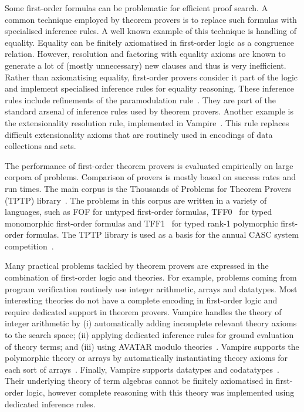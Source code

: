 Some first-order formulas can be problematic for efficient proof search. A common technique employed by theorem provers is to replace such formulas with specialised inference rules. A well known example of this technique is handling of equality. Equality can be finitely axiomatised in first-order logic as a congruence relation. However, resolution and factoring with equality axioms are known to generate a lot of (mostly unnecessary) new clauses and thus is very inefficient. Rather than axiomatising equality, first-order provers consider it part of the logic and implement specialised inference rules for equality reasoning. These inference rules include refinements of the paramodulation rule~\cite{WRCS67,Robinson1969}. They are part of the standard arsenal of inference rules used by theorem provers. Another example is the extensionality resolution rule, implemented in Vampire~\cite{ATVA14}. This rule replaces difficult extensionality axioms that are routinely used in encodings of data collections and sets.

The performance of first-order theorem provers is evaluated empirically on large corpora of problems. Comparison of provers is mostly based on success rates and run times. The main corpus is the Thousands of Problems for Theorem Provers (TPTP) library~\cite{TPTP}. The problems in this corpus are written in a variety of languages, such as FOF for untyped first-order formulas, TFF0~\cite{tff0} for typed monomorphic first-order formulas and TFF1~\cite{tff1} for typed rank-1 polymorphic first-order formulas. The TPTP library is used as a basis for the annual CASC system competition~\cite{CASC}.

Many practical problems tackled by theorem provers are expressed in the combination of first-order logic and theories. For example, problems coming from program verification routinely use integer arithmetic, arrays and datatypes. Most interesting theories do not have a complete encoding in first-order logic and require dedicated support in theorem provers. Vampire handles the theory of integer arithmetic by (i) automatically adding incomplete relevant theory axioms to the search space; (ii) applying dedicated inference rules for ground evaluation of theory terms; and (iii) using AVATAR modulo theories~\cite{DBLP:conf/gcai/RegerB0V16}. Vampire supports the polymorphic theory or arrays by automatically instantiating theory axioms for each sort of arrays~\cite{VampireAndFOOL}. Finally, Vampire supports datatypes and co\-data\-types~\cite{BPR18}. Their underlying theory of term algebras cannot be finitely axiomatised in first-order logic, however complete reasoning with this theory was implemented using dedicated inference rules.

